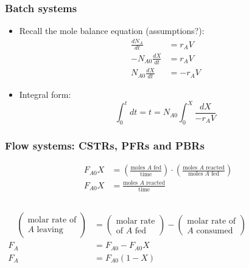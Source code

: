 \begin{frame}\frametitle{Batch systems}
	\begin{itemize}
		\item	Recall the mole balance equation (assumptions?):
		\begin{align*}
			\frac{dN_A}{dt} &= r_AV\\
			-N_{A0}\frac{dX}{dt} &= r_AV\\
			N_{A0}\frac{dX}{dt} &= -r_AV
		\end{align*}
		\item	Integral form: $$\int_0^tdt = t = N_{A0}\int_0^X\frac{dX}{-r_AV}$$
	\end{itemize}
	{}
\end{frame}

\begin{frame}\frametitle{Flow systems: CSTRs, PFRs and PBRs}
	\begin{align*}
		F_{A0}X &= \left(\frac{\text{moles }A\text{ fed}}{\text{time}}\right)\cdot\left(\frac{\text{moles }A\text{ reacted}}{\text{moles }A\text{ fed}}\right)\\
		F_{A0}X &= \frac{\text{moles }A\text{ reacted}}{\text{time}}
	\end{align*}
	\vspace{-36pt}
	\begin{columns}[t]
			\begin{align*}
				\quad\left(\begin{array}{c}
					\text{molar rate of}\\A\text{ leaving}
				\end{array}\right)
				&=
				\left(\begin{array}{c}
					\text{molar rate}\\\text{of }A\text{ fed}
				\end{array}\right)
				-
				\left(\begin{array}{c}
					\text{molar rate of}\\A\text{ consumed}
				\end{array}\right)
				\\
				F_A &= F_{A0} - F_{A0}X\\
				F_A &= F_{A0}(1 - X)
			\end{align*}
	\end{columns}
	\vspace{12pt}
	{\color{myOrange}{Draw a picture here $\rightarrow$}}
\end{frame}

